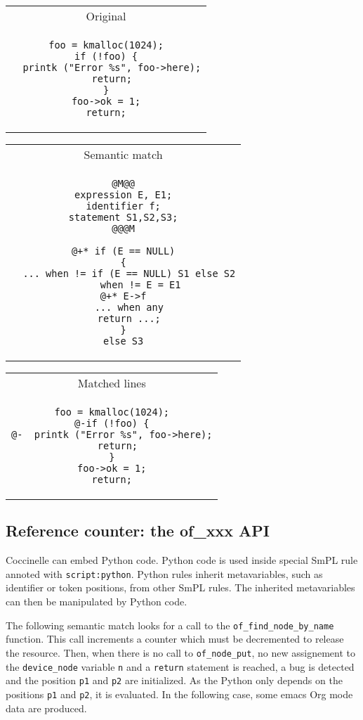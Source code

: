 \begin{tabular}{c}
    Original \\

\begin{lstlisting}
foo = kmalloc(1024);
if (!foo) {
  printk ("Error %s", foo->here);
  return;
}
foo->ok = 1;
return;
\end{lstlisting}\\
  \end{tabular}

\vspace{1cm}

\begin{tabular}{c}
  Semantic match\\

\begin{lstlisting}[language=Cocci]
@M@@
expression E, E1;
identifier f;
statement S1,S2,S3;
@@@M

@+* if (E == NULL)
{
  ... when != if (E == NULL) S1 else S2
      when != E = E1
@+* E->f
  ... when any
  return ...;
}
else S3
\end{lstlisting}\\
\end{tabular}

\vspace{1cm}

\begin{tabular}{c}
  Matched lines\\

\begin{lstlisting}[language=PatchC]
foo = kmalloc(1024);
@-if (!foo) {
@-  printk ("Error %s", foo->here);
  return;
}
foo->ok = 1;
return;
\end{lstlisting}\\
\end{tabular}

\newpage
\subsection{Reference counter: the of\_xxx API}

Coccinelle can embed Python code. Python code is used inside special
SmPL rule annoted with \texttt{script:python}.  Python rules inherit
metavariables, such as identifier or token positions, from other SmPL
rules. The inherited metavariables can then be manipulated by Python
code.

The following semantic match looks for a call to the
\texttt{of\_find\_node\_by\_name} function. This call increments a
counter which must be decremented to release the resource. Then, when
there is no call to \texttt{of\_node\_put}, no new assignement to the
\texttt{device\_node} variable \texttt{n} and a \texttt{return}
statement is reached, a bug is detected and the position \texttt{p1}
and \texttt{p2} are initialized. As the Python only depends on the
positions \texttt{p1} and \texttt{p2}, it is evaluated. In the
following case, some emacs Org mode data are produced.

